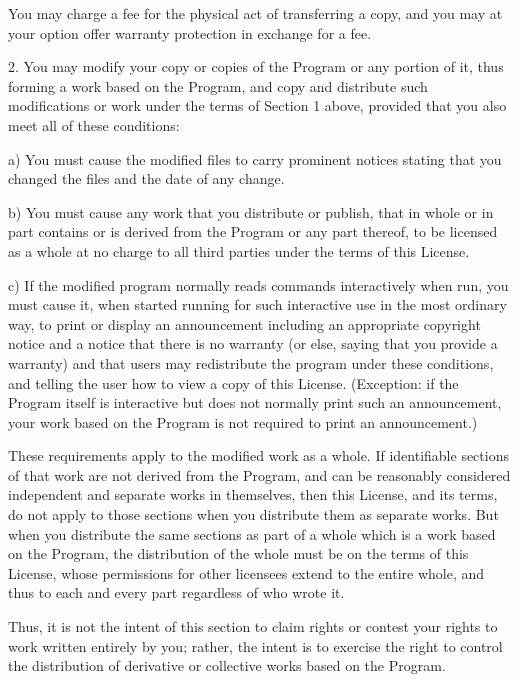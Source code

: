 \documentclass[letterpaper,10pt,english,openany,oneside]{sphinxmanual}
\begin{document}
\begin{sphinxVerbatim}[commandchars=\\\{\}]
You may charge a fee for the physical act of transferring a copy, and
you may at your option offer warranty protection in exchange for a fee.

  2. You may modify your copy or copies of the Program or any portion
of it, thus forming a work based on the Program, and copy and
distribute such modifications or work under the terms of Section 1
above, provided that you also meet all of these conditions:

    a) You must cause the modified files to carry prominent notices
    stating that you changed the files and the date of any change.

    b) You must cause any work that you distribute or publish, that in
    whole or in part contains or is derived from the Program or any
    part thereof, to be licensed as a whole at no charge to all third
    parties under the terms of this License.

    c) If the modified program normally reads commands interactively
    when run, you must cause it, when started running for such
    interactive use in the most ordinary way, to print or display an
    announcement including an appropriate copyright notice and a
    notice that there is no warranty (or else, saying that you provide
    a warranty) and that users may redistribute the program under
    these conditions, and telling the user how to view a copy of this
    License.  (Exception: if the Program itself is interactive but
    does not normally print such an announcement, your work based on
    the Program is not required to print an announcement.)

These requirements apply to the modified work as a whole.  If
identifiable sections of that work are not derived from the Program,
and can be reasonably considered independent and separate works in
themselves, then this License, and its terms, do not apply to those
sections when you distribute them as separate works.  But when you
distribute the same sections as part of a whole which is a work based
on the Program, the distribution of the whole must be on the terms of
this License, whose permissions for other licensees extend to the
entire whole, and thus to each and every part regardless of who wrote it.

Thus, it is not the intent of this section to claim rights or contest
your rights to work written entirely by you; rather, the intent is to
exercise the right to control the distribution of derivative or
collective works based on the Program.


\end{sphinxVerbatim}
\end{document}
